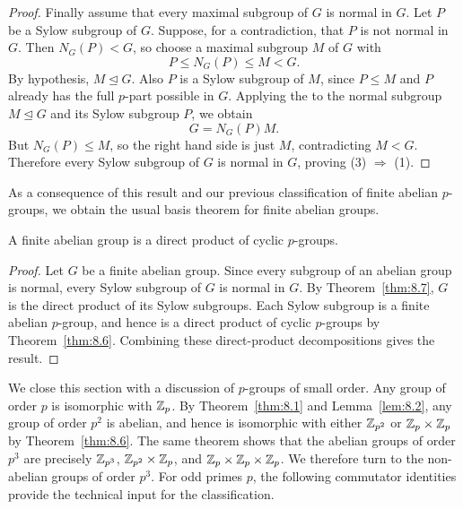 \documentclass[../Odyssey_Project.tex]{subfiles}
\begin{document}
\begin{proof}
Finally assume that every maximal subgroup of $G$ is normal in $G$. Let $P$ be a Sylow subgroup of $G$. Suppose, for a contradiction, that $P$ is not normal in $G$. Then $N_G(P)<G$, so choose a maximal subgroup $M$ of $G$ with
\[
    P\leq N_G(P)\leq M<G.
\]
By hypothesis, $M\trianglelefteq G$. Also $P$ is a Sylow subgroup of $M$, since $P\leq M$ and $P$ already has the full $p$-part possible in $G$. Applying the  to the normal subgroup $M\trianglelefteq G$ and its Sylow subgroup $P$, we obtain
\[
    G=N_G(P)M.
\]
But $N_G(P)\leq M$, so the right hand side is just $M$, contradicting $M<G$. Therefore every Sylow subgroup of $G$ is normal in $G$, proving (3) $\Rightarrow$ (1).
\end{proof}

As a consequence of this result and our previous classification of finite abelian $p$-groups, we obtain the usual basis theorem for finite abelian groups.

\begin{corollary}
\label{cor:8.8}
A finite abelian group is a direct product of cyclic $p$-groups.
\end{corollary}
\begin{proof}
Let $G$ be a finite abelian group. Since every subgroup of an abelian group is normal, every Sylow subgroup of $G$ is normal in $G$. By Theorem~\ref{thm:8.7}, $G$ is the direct product of its Sylow subgroups. Each Sylow subgroup is a finite abelian $p$-group, and hence is a direct product of cyclic $p$-groups by Theorem~\ref{thm:8.6}. Combining these direct-product decompositions gives the result.
\end{proof}

We close this section with a discussion of $p$-groups of small order. Any group of order $p$ is isomorphic with $\mathbb{Z}_p$. By Theorem~\ref{thm:8.1} and Lemma~\ref{lem:8.2}, any group of order $p^2$ is abelian, and hence is isomorphic with either $\mathbb{Z}_{p^2}$ or $\mathbb{Z}_p \times \mathbb{Z}_p$ by Theorem~\ref{thm:8.6}. The same theorem shows that the abelian groups of order $p^3$ are precisely $\mathbb{Z}_{p^3}$, $\mathbb{Z}_{p^2} \times \mathbb{Z}_p$, and $\mathbb{Z}_p \times \mathbb{Z}_p \times \mathbb{Z}_p$. We therefore turn to the non-abelian groups of order $p^3$. For odd primes $p$, the following commutator identities provide the technical input for the classification.
\end{document}
